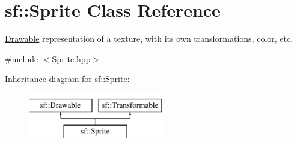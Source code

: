 \hypertarget{classsf_1_1_sprite}{}\section{sf\+:\+:Sprite Class Reference}
\label{classsf_1_1_sprite}


\mbox{\hyperlink{classsf_1_1_drawable}{Drawable}} representation of a texture, with its own transformations, color, etc.  




{\ttfamily \#include $<$Sprite.\+hpp$>$}

Inheritance diagram for sf\+:\+:Sprite\+:\begin{figure}[H]
\begin{center}
\leavevmode
\includegraphics[height=2.000000cm]{classsf_1_1_sprite}
\end{center}
\end{figure}
